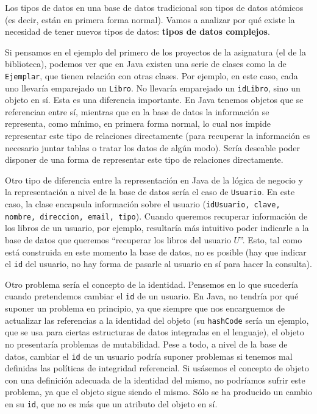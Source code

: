 \documentclass[12pt, a4paper]{article}
\title{\size{15pt}{Tipos de datos complejos} \vspace{-2ex}}
\date{\vspace{-5ex}}
\author{\size{12pt}{Aldán Creo Mariño} \vspace{-5ex}}
\begin{document}
\maketitle
\thispagestyle{empty}

\vspace{-5ex}

Los tipos de datos en una base de datos tradicional son tipos de datos atómicos (es decir, están en primera forma normal). Vamos a analizar por qué existe la necesidad de tener nuevos tipos de datos: \textbf{tipos de datos complejos}.

Si pensamos en el ejemplo del primero de los proyectos de la asignatura (el de la biblioteca), podemos ver que en Java existen una serie de clases como la de \texttt{Ejemplar}, que tienen relación con otras clases. Por ejemplo, en este caso, cada uno llevaría emparejado un \texttt{Libro}. No llevaría emparejado un \texttt{idLibro}, sino un objeto en sí. Esta es una diferencia importante. En Java tenemos objetos que se referencian entre sí, mientras que en la base de datos la información se representa, como mínimo, en primera forma normal, lo cual nos impide representar este tipo de relaciones directamente (para recuperar la información es necesario juntar tablas o tratar los datos de algún modo). Sería deseable poder disponer de una forma de representar este tipo de relaciones directamente.

Otro tipo de diferencia entre la representación en Java de la lógica de negocio y la representación a nivel de la base de datos sería el caso de \texttt{Usuario}. En este caso, la clase encapsula información sobre el usuario (\texttt{idUsuario, clave, nombre, direccion, email, tipo}). Cuando queremos recuperar información de los libros de un usuario, por ejemplo, resultaría más intuitivo poder indicarle a la base de datos que queremos ``recuperar los libros del usuario $U$''. Esto, tal como está construida en este momento la base de datos, no es posible (hay que indicar el \texttt{id} del usuario, no hay forma de pasarle al usuario en sí para hacer la consulta).

Otro problema sería el concepto de la identidad. Pensemos en lo que sucedería cuando pretendemos cambiar el \texttt{id} de un usuario. En Java, no tendría por qué suponer un problema en principio, ya que siempre que nos encarguemos de actualizar las referencias a la identidad del objeto (su \texttt{hashCode} sería un ejemplo, que se usa para ciertas estructuras de datos integradas en el lenguaje), el objeto no presentaría problemas de mutabilidad. Pese a todo, a nivel de la base de datos, cambiar el \texttt{id} de un usuario podría suponer problemas si tenemos mal definidas las políticas de integridad referencial. Si usásemos el concepto de objeto con una definición adecuada de la identidad del mismo, no podríamos sufrir este problema, ya que el objeto sigue siendo el mismo. Sólo se ha producido un cambio en su \texttt{id}, que no es más que un atributo del objeto en sí.
\end{document}
